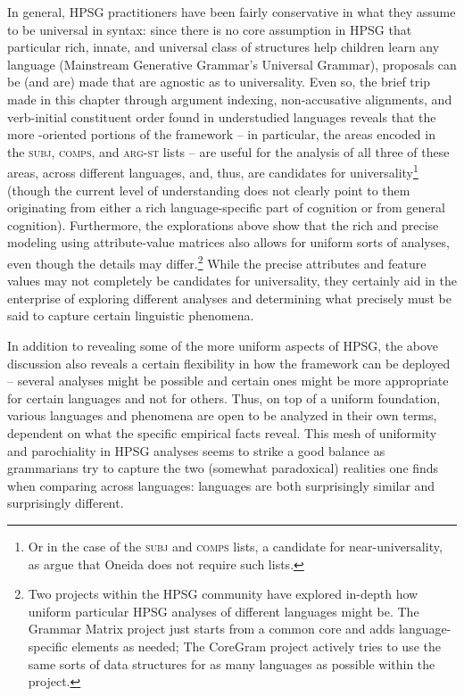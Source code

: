 \documentclass[output=paper
                ,modfonts
                ,nonflat
	        ,collection
	        ,collectionchapter
	        ,collectiontoclongg
 	        ,biblatex
                ,babelshorthands
                ,newtxmath
                ,draftmode
                ,colorlinks, citecolor=brown
]{./langsci/langscibook}
\begin{document}
{In general, HPSG practitioners have been fairly conservative in what they assume to be universal in syntax: since there is no core assumption in HPSG that particular rich, innate, and universal class of structures help children learn any language (Mainstream Generative Grammar's Universal Grammar), proposals can be (and are) made that are agnostic as to universality. Even so, the brief trip made in this chapter through argument indexing, non-accusative alignments, and verb-initial constituent order found in understudied languages reveals that the more -oriented portions of the framework -- in particular, the areas encoded in the \textsc{subj}, \textsc{comps}, and \textsc{arg-st} lists -- are useful for the analysis of all three of these areas, across different languages, and, thus, are candidates for universality\footnote{Or in the case of the \textsc{subj} and \textsc{comps} lists, a candidate for near-universality, as \cite{KM15} argue that Oneida does not require such lists.} (though the current level of understanding does not clearly point to them originating from either a rich language-specific part of cognition or from general cognition). Furthermore, the explorations above show that the rich and precise modeling using attribute-value matrices also allows for uniform sorts of analyses, even though the details may differ.\footnote{Two projects within the HPSG community have explored in-depth how uniform particular HPSG analyses of different languages might be. The Grammar Matrix project \citep{BDFPS2010a-u} just starts from a common core and adds language-specific elements as needed; The CoreGram project \citep{MuellerCoreGram} actively tries to use the same sorts of data structures for as many languages as possible within the project.} While the precise attributes and feature values may not completely be candidates for universality, they certainly aid in the enterprise of exploring different analyses and determining what precisely must be said to capture certain linguistic phenomena. 

In addition to revealing some of the more uniform aspects of HPSG, the above discussion also reveals a certain flexibility in how the framework can be deployed -- several analyses might be possible and certain ones might be more appropriate for certain languages and not for others. Thus, on top of a uniform foundation, various languages and phenomena are open to be analyzed in their own terms, dependent on what the specific empirical facts reveal. This mesh of uniformity and parochiality in HPSG analyses seems to strike a good balance as grammarians try to capture the two (somewhat paradoxical) realities one finds when comparing across languages: languages are both surprisingly similar and surprisingly different.                 

}
\end{document}
